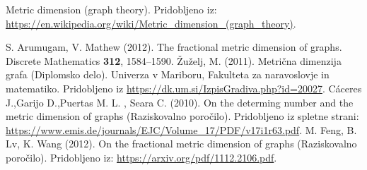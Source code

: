 \documentclass[a4paper]{report}
\begin{document}
\begin{thebibliography}{99}

 Metric dimension (graph theory). Pridobljeno iz: \url{https://en.wikipedia.org/wiki/Metric_dimension_(graph_theory)}.

 S. Arumugam, V. Mathew (2012). The fractional metric dimension of graphs. Discrete Mathematics \textbf{312}, 1584–1590.
 Žuželj, M. (2011). Metrična dimenzija grafa (Diplomsko delo). Univerza v Mariboru, Fakulteta za naravoslovje in matematiko. Pridobljeno iz \url{https://dk.um.si/IzpisGradiva.php?id=20027}.
 Cáceres J.,Garijo D.,Puertas M. L. , Seara C. (2010). On the determing number and the metric dimension of graphs (Raziskovalno poročilo). Pridobljeno iz spletne strani: \url{https://www.emis.de/journals/EJC/Volume_17/PDF/v17i1r63.pdf}.
 M. Feng, B. Lv, K. Wang (2012). On the fractional metric dimension of graphs (Raziskovalno poročilo). Pridobljeno iz: \url{https://arxiv.org/pdf/1112.2106.pdf}.

\end{thebibliography}
\end{document}
